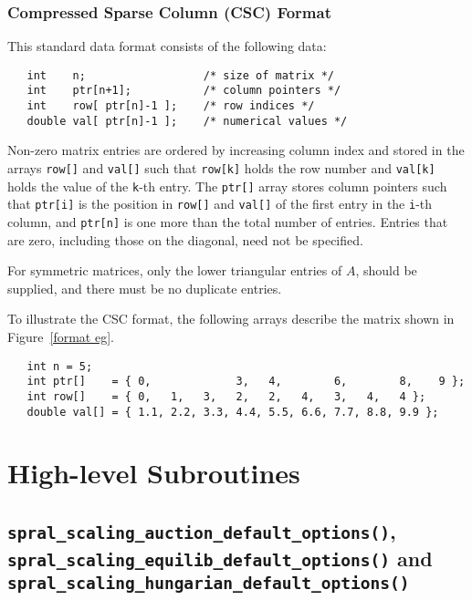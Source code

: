 \subsubsection{Compressed Sparse Column (CSC) Format} \label{cscformat}
This standard data format consists of the following data:
\begin{verbatim}
   int    n;                  /* size of matrix */
   int    ptr[n+1];           /* column pointers */
   int    row[ ptr[n]-1 ];    /* row indices */
   double val[ ptr[n]-1 ];    /* numerical values */
\end{verbatim}
Non-zero matrix entries are ordered by increasing column index and stored in
the arrays \texttt{row[]} and \texttt{val[]} such that \texttt{row[k]} holds
the row number and \texttt{val[k]} holds the value of the \texttt{k}-th entry.
The \texttt{ptr[]} array stores column pointers such that \texttt{ptr[i]} is
the position in \texttt{row[]} and \texttt{val[]} of
the first entry in the \texttt{i}-th column, and \texttt{ptr[n]} is one more
than the total number of entries.
Entries that are zero, including those on the diagonal, need not be specified.

For symmetric matrices, only the lower triangular entries of $A$, should be
supplied, and there must be no duplicate entries. 

To illustrate the CSC format, the following arrays describe the matrix shown in
Figure~\ref{format eg}.
\begin{verbatim}
   int n = 5;
   int ptr[]    = { 0,             3,   4,        6,        8,    9 };
   int row[]    = { 0,   1,   3,   2,   2,   4,   3,   4,   4 };
   double val[] = { 1.1, 2.2, 3.3, 4.4, 5.5, 6.6, 7.7, 8.8, 9.9 };
\end{verbatim}


\section{High-level Subroutines}

\subsection{\texttt{spral\_scaling\_auction\_default\_options()}, 
   \texttt{spral\_scaling\_equilib\_default\_options()} and
   \texttt{spral\_scaling\_hungarian\_default\_options()}}


